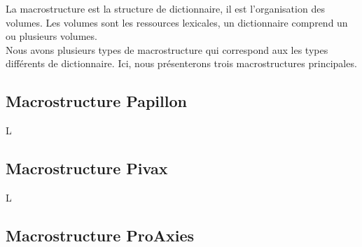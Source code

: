 \documentclass[10pt,a4paper,twoside]{article}
\begin{document}
La macrostructure est la structure de dictionnaire, il est l’organisation des volumes. Les volumes sont les ressources lexicales, un dictionnaire comprend un ou plusieurs volumes.\\
Nous avons plusieurs types de macrostructure qui correspond aux les types différents de dictionnaire.  Ici, nous présenterons trois macrostructures principales.\\

\subsection{Macrostructure Papillon}

L \cite{GSMM01a}

\subsection{Macrostructure Pivax}

L \cite{MMHTN09}

\subsection{Macrostructure ProAxies}
\end{document}
